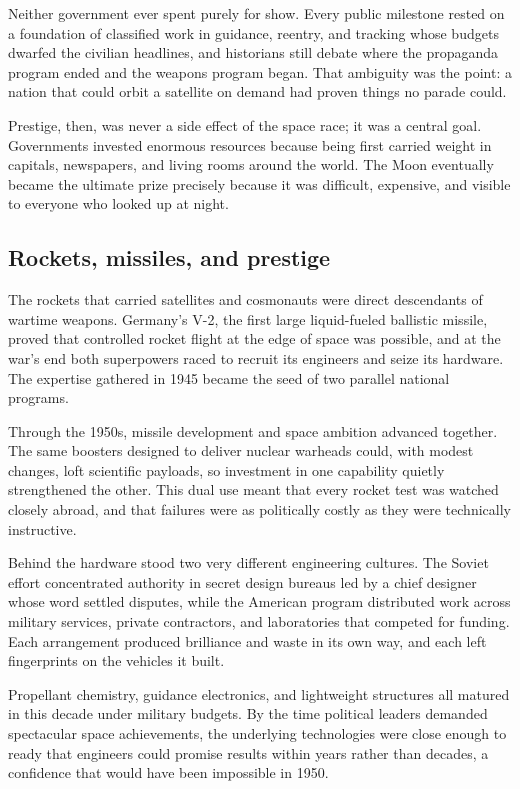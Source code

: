 Neither government ever spent purely for show. Every public milestone rested on a foundation of classified work in guidance, reentry, and tracking whose budgets dwarfed the civilian headlines, and historians still debate where the propaganda program ended and the weapons program began. That ambiguity was the point: a nation that could orbit a satellite on demand had proven things no parade could.

Prestige, then, was never a side effect of the space race; it was a central goal. Governments invested enormous resources because being first carried weight in capitals, newspapers, and living rooms around the world. The Moon eventually became the ultimate prize precisely because it was difficult, expensive, and visible to everyone who looked up at night. \cite{siddiqi2010} \cite{mcdougall1985} \cite{cadbury2006}

\subsection{Rockets, missiles, and prestige}
The rockets that carried satellites and cosmonauts were direct descendants of wartime weapons. Germany's V-2, the first large liquid-fueled ballistic missile, proved that controlled rocket flight at the edge of space was possible, and at the war's end both superpowers raced to recruit its engineers and seize its hardware. The expertise gathered in 1945 became the seed of two parallel national programs.

Through the 1950s, missile development and space ambition advanced together. The same boosters designed to deliver nuclear warheads could, with modest changes, loft scientific payloads, so investment in one capability quietly strengthened the other. This dual use meant that every rocket test was watched closely abroad, and that failures were as politically costly as they were technically instructive.

Behind the hardware stood two very different engineering cultures. The Soviet effort concentrated authority in secret design bureaus led by a chief designer whose word settled disputes, while the American program distributed work across military services, private contractors, and laboratories that competed for funding. Each arrangement produced brilliance and waste in its own way, and each left fingerprints on the vehicles it built.

Propellant chemistry, guidance electronics, and lightweight structures all matured in this decade under military budgets. By the time political leaders demanded spectacular space achievements, the underlying technologies were close enough to ready that engineers could promise results within years rather than decades, a confidence that would have been impossible in 1950.

